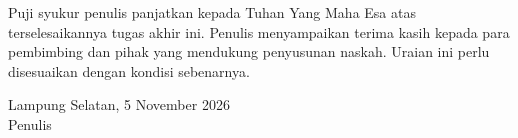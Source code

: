 Puji syukur penulis panjatkan kepada Tuhan Yang Maha Esa atas terselesaikannya tugas akhir ini. Penulis menyampaikan terima kasih kepada para pembimbing dan pihak yang mendukung penyusunan naskah. Uraian ini perlu disesuaikan dengan kondisi sebenarnya.

\begin{flushright}
Lampung Selatan, 5 November 2026\\[2ex]
Penulis
\end{flushright}
